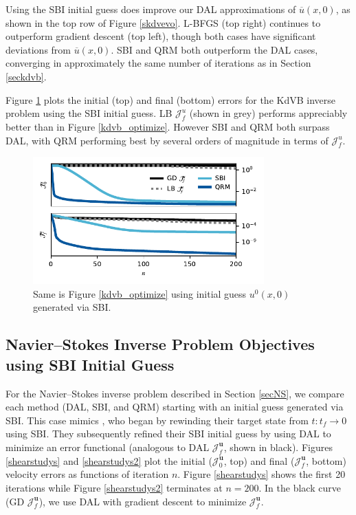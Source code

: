 \documentclass[%
 reprint,
 amsmath,amssymb,
 aps,
 pre,
]{revtex4-2}
\renewcommand{\vec}[1]{\boldsymbol{#1}}
\newcommand{\Juf}{\mathcal{J}^{u}_f}
\newcommand{\JUo}{\mathcal{J}^{\vec{u}}_0}
\newcommand{\JUf}{\mathcal{J}^{\vec{u}}_f}
\begin{document}
Using the SBI initial guess does improve our DAL approximations of $\overline{u}(x,0)$, as shown in the top row of Figure \ref{skdvevo}.
L-BFGS (top right) continues to outperform gradient descent (top left), though both cases have significant deviations from $\overline{u}(x,0)$.
SBI and QRM both outperform the DAL cases, converging in approximately the same number of iterations as in Section \ref{seckdvb}.

Figure \ref{skdvb_optimize} plots the initial (top) and final (bottom) errors for the KdVB inverse problem using the SBI initial guess.
LB $\Juf$ (shown in grey) performs appreciably better than in Figure \ref{kdvb_optimize}.
However SBI and QRM both surpass DAL, with QRM performing best by several orders of magnitude in terms of $\Juf$.

\begin{figure}
  \centering
  \includegraphics[width=3.5in]{sapprox/PLTC/all.pdf}
  \caption{Same is Figure \ref{kdvb_optimize} using initial guess $u^0(x, 0)$ generated via SBI.}
  \label{skdvb_optimize}
\end{figure}

\subsection{Navier--Stokes Inverse Problem Objectives using SBI Initial Guess}\label{secAppNSBI}

For the Navier--Stokes inverse problem described in Section \ref{secNS}, we compare each method (DAL, SBI, and QRM) starting with an initial guess generated via SBI. 
This case mimics \cite{Li2017,Liu2008}, who began by rewinding their target state from $t:t_f\to 0$ using SBI. 
They subsequently refined their SBI initial guess by using DAL to minimize an error functional (analogous to DAL $\JUf$, shown in black). 
Figures \ref{shearstudys} and \ref{shearstudys2} plot the initial ($\JUo$, top) and final ($\JUf$, bottom) velocity errors as functions of iteration $n$.
Figure \ref{shearstudys} shows the first 20 iterations while Figure \ref{shearstudys2} terminates at $n=200$.
In the black curve (GD $\JUf$), we use DAL with gradient descent to minimize $\JUf$. 
\end{document}
